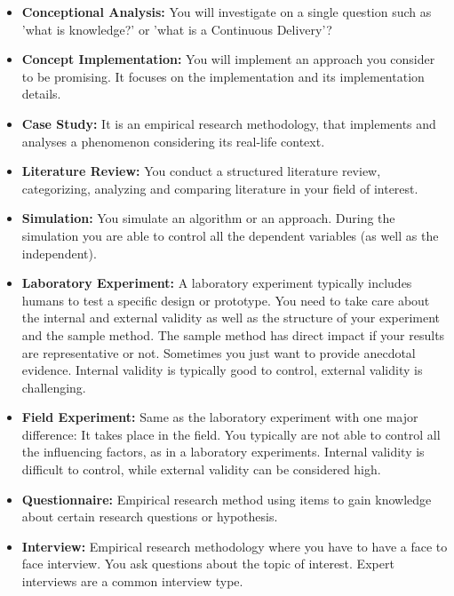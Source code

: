 \begin{itemize}
\item \textbf{Conceptional Analysis:} You will investigate on a single question such as 'what is knowledge?' or 'what is a Continuous Delivery'? 
\item \textbf{Concept Implementation:} You will implement an approach you consider to be promising. It focuses on the implementation and its implementation details.
\item \textbf{Case Study:} It is an empirical research methodology, that implements and analyses a phenomenon considering its real-life context.
\item \textbf{Literature Review:} You conduct a structured literature review, categorizing, analyzing and comparing literature in your field of interest. 
\item \textbf{Simulation:} You simulate an algorithm or an approach. During the simulation you are able to control all the dependent variables (as well as the independent).
\item \textbf{Laboratory Experiment:} A laboratory experiment typically includes humans to test a specific design or prototype. You need to take care about the internal and external validity as well as the structure of your experiment and the sample method. The sample method has direct impact if your results are representative or not. Sometimes you just want to provide anecdotal evidence. Internal validity is typically good to control, external validity is challenging.
\item \textbf{Field Experiment:} Same as the laboratory experiment with one major difference: It takes place in the field. You typically are not able to control all the influencing factors, as in a laboratory experiments. Internal validity is difficult to control, while external validity can be considered high. 
\item \textbf{Questionnaire:} Empirical research method using items to gain knowledge about certain research questions or hypothesis. 
\item \textbf{Interview:} Empirical research methodology where you have to have a face to face interview. You ask questions about the topic of interest. Expert interviews are a common interview type.

\end{itemize}
